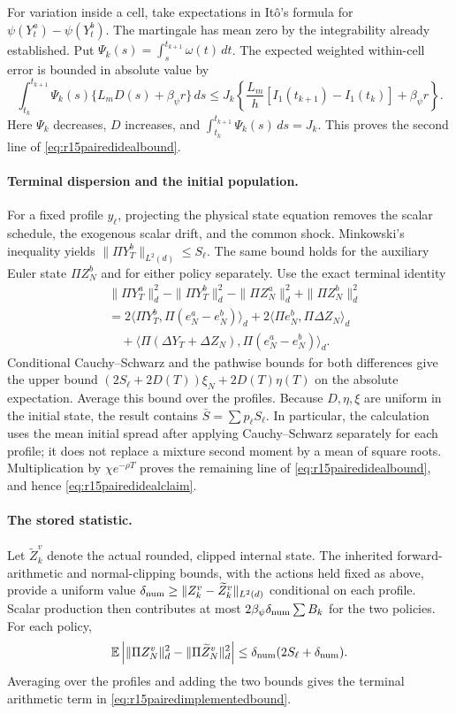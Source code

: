For variation inside a cell, take expectations in It\^o's formula for
$\psi(Y_t^a)-\psi(Y_t^b)$. The martingale has mean zero by the
integrability already established. Put
$\Psi_k(s)=\int_s^{t_{k+1}}\omega(t)\,dt$. The expected weighted
within-cell error is bounded in absolute value by
\[
 \int_{t_k}^{t_{k+1}}\Psi_k(s)
                          \{L_mD(s)+\beta_\psi r\}\,ds
 \leq J_k\left\{\frac{L_m}{h}
       [I_1(t_{k+1})-I_1(t_k)]+\beta_\psi r\right\}.
\]
Here $\Psi_k$ decreases, $D$ increases, and
$\int_{t_k}^{t_{k+1}}\Psi_k(s)\,ds=J_k$.
This proves the second line of \eqref{eq:r15pairedidealbound}.

\paragraph*{Terminal dispersion and the initial population.}
For a fixed profile $y_\ell$, projecting the physical state equation removes
the scalar schedule, the exogenous scalar drift, and the common shock.
Minkowski's inequality yields
$\|\Pi Y_T^b\|_{L^2(d)}\leq S_\ell$.
The same bound holds for the auxiliary Euler state $\Pi Z_N^b$ and for
either policy separately. Use the exact terminal identity
\begin{align*}
 &\|\Pi Y_T^a\|_d^2-\|\Pi Y_T^b\|_d^2
                 -\|\Pi Z_N^a\|_d^2+\|\Pi Z_N^b\|_d^2\\
 &=2\langle\Pi Y_T^b,\Pi(e_N^a-e_N^b)\rangle_d
       +2\langle\Pi e_N^b,\Pi\Delta Z_N\rangle_d\\
 &\quad+\langle\Pi(\Delta Y_T+\Delta Z_N),
                              \Pi(e_N^a-e_N^b)\rangle_d.
\end{align*}
Conditional Cauchy--Schwarz and the pathwise bounds for both differences
give the upper bound
$(2S_\ell+2D(T))\xi_N+2D(T)\eta(T)$ on the absolute expectation.
Average this bound over the profiles. Because $D,\eta,\xi$ are uniform
in the initial state, the result contains $\bar S=\sum p_\ell S_\ell$.
In particular, the calculation uses the mean initial spread after applying
Cauchy--Schwarz separately for each profile; it does not replace a mixture
second moment by a mean of square roots. Multiplication by
$\chi e^{-\rho T}$ proves the remaining line of
\eqref{eq:r15pairedidealbound}, and hence
\eqref{eq:r15pairedidealclaim}.

\paragraph*{The stored statistic.}
Let $\widetilde Z_k^v$ denote the actual rounded, clipped internal state.
The inherited forward-arithmetic and normal-clipping bounds, with the
actions held fixed as above, provide a uniform value
$\delta_{\rm num}\geq
\|Z_k^v-\widetilde Z_k^v\|_{L^2(d)}$ conditional on each profile.
Scalar production then contributes at most
$2\beta_\psi\delta_{\rm num}\sum B_k$ for the two policies.
For each policy,
\[
 \mathbb E\left|\|\Pi Z_N^v\|_d^2
                         -\|\Pi\widetilde Z_N^v\|_d^2\right|
 \leq\delta_{\rm num}(2S_\ell+\delta_{\rm num}).
\]
Averaging over the profiles and adding the two bounds gives the terminal
arithmetic term in \eqref{eq:r15pairedimplementedbound}.


